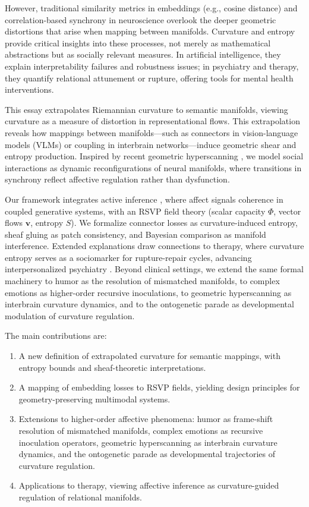 \documentclass{article}
\theoremstyle{definition}
\begin{document}
However, traditional similarity metrics in embeddings (e.g., cosine distance) and correlation-based synchrony in neuroscience overlook the deeper geometric distortions that arise when mapping between manifolds. Curvature and entropy provide critical insights into these processes, not merely as mathematical abstractions but as socially relevant measures. In artificial intelligence, they explain interpretability failures and robustness issues; in psychiatry and therapy, they quantify relational attunement or rupture, offering tools for mental health interventions.

This essay extrapolates Riemannian curvature to semantic manifolds, viewing curvature as a measure of distortion in representational flows. This extrapolation reveals how mappings between manifolds—such as connectors in vision-language models (VLMs) or coupling in interbrain networks—induce geometric shear and entropy production. Inspired by recent geometric hyperscanning \cite{hinrichs2025geometry}, we model social interactions as dynamic reconfigurations of neural manifolds, where transitions in synchrony reflect affective regulation rather than dysfunction.

Our framework integrates active inference \cite{friston2017graphical}, where affect signals coherence in coupled generative systems, with an RSVP field theory (scalar capacity $\Phi$, vector flows $\mathbf{v}$, entropy $S$). We formalize connector losses as curvature-induced entropy, sheaf gluing as patch consistency, and Bayesian comparison as manifold interference. Extended explanations draw connections to therapy, where curvature entropy serves as a sociomarker for rupture-repair cycles, advancing interpersonalized psychiatry \cite{adel2025systematic}. Beyond clinical settings, we extend the same formal machinery to humor as the resolution of mismatched manifolds, to complex emotions as higher-order recursive inoculations, to geometric hyperscanning as interbrain curvature dynamics, and to the ontogenetic parade as developmental modulation of curvature regulation.

The main contributions are:
\begin{enumerate}
  \item A new definition of extrapolated curvature for semantic mappings, with entropy bounds and sheaf-theoretic interpretations.
  \item A mapping of embedding losses to RSVP fields, yielding design principles for geometry-preserving multimodal systems.
  \item Extensions to higher-order affective phenomena: humor as frame-shift resolution of mismatched manifolds, complex emotions as recursive inoculation operators, geometric hyperscanning as interbrain curvature dynamics, and the ontogenetic parade as developmental trajectories of curvature regulation.
  \item Applications to therapy, viewing affective inference as curvature-guided regulation of relational manifolds.
\end{enumerate}
\end{document}
